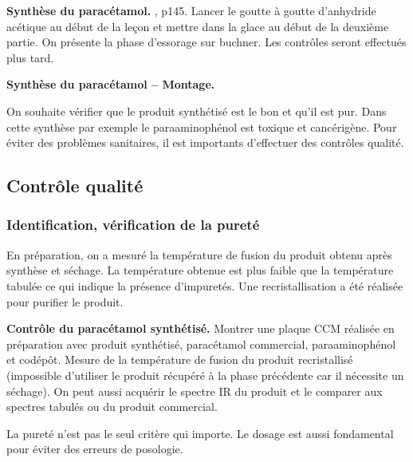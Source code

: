 \begin{experience}
\textbf{Synthèse du paracétamol.}
\cite{Mesplede2002}, p145.
Lancer le goutte à goutte d'anhydride acétique au début de la leçon et mettre dans la glace au début de la deuxième partie.
On présente la phase d'essorage sur buchner.
Les contrôles seront effectués plus tard.
\end{experience}

\begin{slide}
\textbf{Synthèse du paracétamol -- Montage.}
\end{slide}

\begin{transition}
On souhaite vérifier que le produit synthétisé est le bon et qu'il est pur.
Dans cette synthèse par exemple le paraaminophénol est toxique et cancérigène.
Pour éviter des problèmes sanitaires, il est importants d'effectuer des contrôles qualité. 
\end{transition}

\subsection{Contrôle qualité}

\subsubsection{Identification, vérification de la pureté}

En préparation, on a mesuré la température de fusion du produit obtenu après synthèse et séchage.
La température obtenue est plus faible que la température tabulée ce qui indique la présence d'impuretés.
Une recristallisation a été réalisée pour purifier le produit.

\begin{experience}
\textbf{Contrôle du paracétamol synthétisé.}
Montrer une plaque CCM réalisée en préparation avec produit synthétisé, paracétamol commercial, paraaminophénol et codépôt.
Mesure de la température de fusion du produit recristallisé (impossible d'utiliser le produit récupéré à la phase précédente car il nécessite un séchage).
On peut aussi acquérir le spectre IR du produit et le comparer aux spectres tabulés ou du produit commercial.
\end{experience}

\begin{transition}
La pureté n'est pas le seul critère qui importe.
Le dosage est aussi fondamental pour éviter des erreurs de posologie.
\end{transition}

